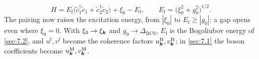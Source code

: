 \begin{equation}
  H = E_{\mathrm{f}}\bigl(\tilde c_1^\dagger\tilde c_1 + \tilde c_2^\dagger\tilde c_2\bigr) + \xi_0 - E_{\mathrm{f}}, \qquad E_{\mathrm{f}} = \bigl(\xi_0^2 + g_0^2\bigr)^{1/2} .
  \label{eq:C.7-Efermion}
\end{equation}
The pairing now raises the excitation energy, from $|\xi_0|$ to $E_{\mathrm{f}} \ge |g_0|$: a gap opens even where $\xi_0 = 0$. With $\xi_0 \to \xi_{\bm{k}}$ and $g_0 \to \Delta_{\mathrm{BCS}}$, $E_{\mathrm{f}}$ is the Bogoliubov energy of \cref{sec:7.2}, and $u^{\mathrm{f}}, v^{\mathrm{f}}$ become the coherence factors $u^{\mathrm{B}}_{\bm{k}}, v^{\mathrm{B}}_{\bm{k}}$; in \cref{sec:7.1} the boson coefficients become $u^{\mathrm{M}}_{\bm{k}}, v^{\mathrm{M}}_{\bm{k}}$.
